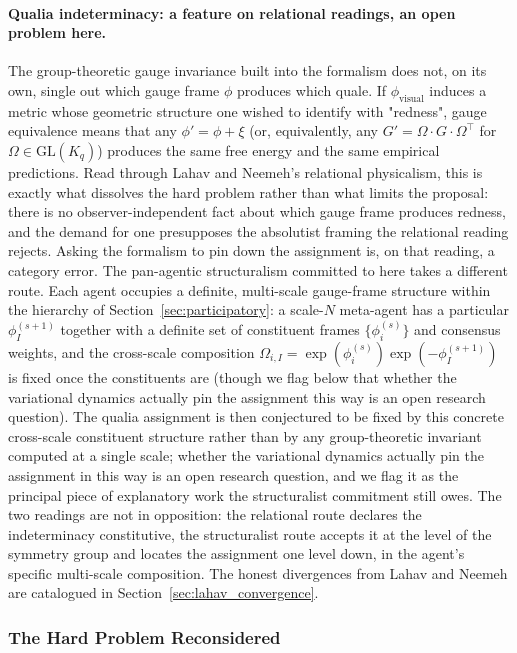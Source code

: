 \documentclass[11pt]{article}
\begin{document}
\paragraph{Qualia indeterminacy: a feature on relational readings, an open problem here.}
The group-theoretic gauge invariance built into the formalism does not, on its own, single out which gauge frame $\phi$ produces which quale. If $\phi_{\text{visual}}$ induces a metric whose geometric structure one wished to identify with "redness", gauge equivalence means that any $\phi' = \phi + \xi$ (or, equivalently, any $G' = \Omega \cdot G \cdot \Omega^\top$ for $\Omega \in \mathrm{GL}(K_q)$) produces the same free energy and the same empirical predictions. Read through Lahav and Neemeh's relational physicalism, this is exactly what dissolves the hard problem rather than what limits the proposal: there is no observer-independent fact about which gauge frame produces redness, and the demand for one presupposes the absolutist framing the relational reading rejects. Asking the formalism to pin down the assignment is, on that reading, a category error. The pan-agentic structuralism committed to here takes a different route. Each agent occupies a definite, multi-scale gauge-frame structure within the hierarchy of Section~\ref{sec:participatory}: a scale-$N$ meta-agent has a particular $\phi_I^{(s+1)}$ together with a definite set of constituent frames $\{\phi_i^{(s)}\}$ and consensus weights, and the cross-scale composition $\Omega_{i,I} = \exp(\phi_i^{(s)}) \exp(-\phi_I^{(s+1)})$ is fixed once the constituents are (though we flag below that whether the variational dynamics actually pin the assignment this way is an open research question). The qualia assignment is then conjectured to be fixed by this concrete cross-scale constituent structure rather than by any group-theoretic invariant computed at a single scale; whether the variational dynamics actually pin the assignment in this way is an open research question, and we flag it as the principal piece of explanatory work the structuralist commitment still owes. The two readings are not in opposition: the relational route declares the indeterminacy constitutive, the structuralist route accepts it at the level of the symmetry group and locates the assignment one level down, in the agent's specific multi-scale composition. The honest divergences from Lahav and Neemeh are catalogued in Section~\ref{sec:lahav_convergence}.

\subsubsection{The Hard Problem Reconsidered}
\end{document}
